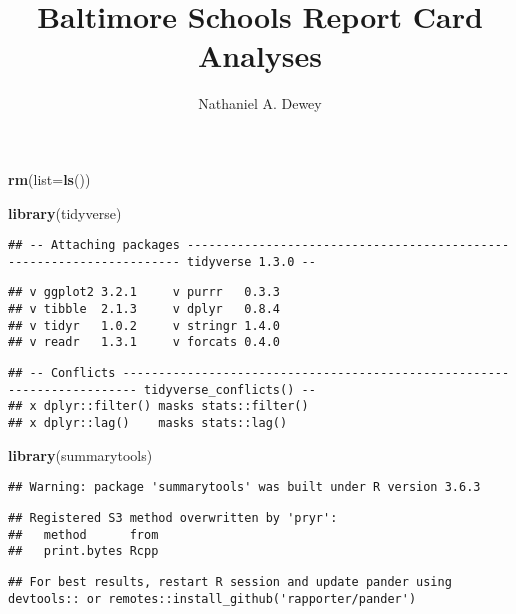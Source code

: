 \documentclass[
]{article}
\title{Baltimore Schools Report Card Analyses}
\author{Nathaniel A. Dewey}
\date{}
\newenvironment{Shaded}{\begin{snugshade}}{\end{snugshade}}
\newcommand{\DataTypeTok}[1]{\textcolor[rgb]{0.13,0.29,0.53}{#1}}
\newcommand{\KeywordTok}[1]{\textcolor[rgb]{0.13,0.29,0.53}{\textbf{#1}}}
\newcommand{\NormalTok}[1]{#1}
\begin{document}
\maketitle

\begin{Shaded}
\begin{Highlighting}[]
\KeywordTok{rm}\NormalTok{(}\DataTypeTok{list=}\KeywordTok{ls}\NormalTok{())}

\KeywordTok{library}\NormalTok{(tidyverse)}
\end{Highlighting}
\end{Shaded}

\begin{verbatim}
## -- Attaching packages --------------------------------------------------------------------- tidyverse 1.3.0 --
\end{verbatim}

\begin{verbatim}
## v ggplot2 3.2.1     v purrr   0.3.3
## v tibble  2.1.3     v dplyr   0.8.4
## v tidyr   1.0.2     v stringr 1.4.0
## v readr   1.3.1     v forcats 0.4.0
\end{verbatim}

\begin{verbatim}
## -- Conflicts ------------------------------------------------------------------------ tidyverse_conflicts() --
## x dplyr::filter() masks stats::filter()
## x dplyr::lag()    masks stats::lag()
\end{verbatim}

\begin{Shaded}
\begin{Highlighting}[]
\KeywordTok{library}\NormalTok{(summarytools)}
\end{Highlighting}
\end{Shaded}

\begin{verbatim}
## Warning: package 'summarytools' was built under R version 3.6.3
\end{verbatim}

\begin{verbatim}
## Registered S3 method overwritten by 'pryr':
##   method      from
##   print.bytes Rcpp
\end{verbatim}

\begin{verbatim}
## For best results, restart R session and update pander using devtools:: or remotes::install_github('rapporter/pander')
\end{verbatim}
\end{document}
